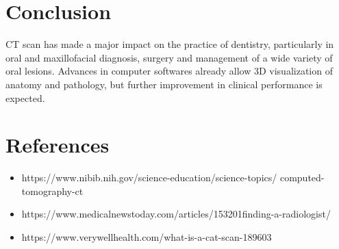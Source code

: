 \documentclass[12pt]{article}
\begin{document}
\section*{ \huge Conclusion}
\large
CT scan has made a major impact on the practice of dentistry, particularly in oral and maxillofacial diagnosis, surgery and management of a wide variety of oral lesions. Advances in computer softwares already allow 3D visualization of anatomy and pathology, but further improvement in clinical performance is expected.

\vspace{10mm}


\section*{ \huge References }
\large
\vspace{3mm}
\begin{itemize}

\item https://www.nibib.nih.gov/science-education/science-topics/  computed-tomography-ct 


\item  https://www.medicalnewstoday.com/articles/153201finding-a-radiologist/

\item https://www.verywellhealth.com/what-is-a-cat-scan-189603

\end{itemize}

\enddocument
\end{document}
